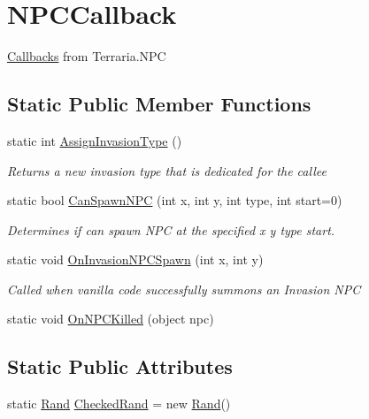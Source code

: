 \hypertarget{classOTA_1_1Callbacks_1_1NPCCallback}{}\section{N\+P\+C\+Callback}
\label{classOTA_1_1Callbacks_1_1NPCCallback}


\hyperlink{namespaceOTA_1_1Callbacks}{Callbacks} from Terraria.\+N\+P\+C  


\subsection*{Static Public Member Functions}
\begin{DoxyCompactItemize}
\item 
static int \hyperlink{classOTA_1_1Callbacks_1_1NPCCallback_a4e28a06fc52f876963bbcbe5fd3c05cb}{Assign\+Invasion\+Type} ()
\begin{DoxyCompactList}\small\item\em Returns a new invasion type that is dedicated for the callee \end{DoxyCompactList}\item 
static bool \hyperlink{classOTA_1_1Callbacks_1_1NPCCallback_a91e5759f1b696acfcd3517e08e2065eb}{Can\+Spawn\+N\+P\+C} (int x, int y, int type, int start=0)
\begin{DoxyCompactList}\small\item\em Determines if can spawn N\+P\+C at the specified x y type start. \end{DoxyCompactList}\item 
static void \hyperlink{classOTA_1_1Callbacks_1_1NPCCallback_a618416750b92cfc4cdf8cda1f605e512}{On\+Invasion\+N\+P\+C\+Spawn} (int x, int y)
\begin{DoxyCompactList}\small\item\em Called when vanilla code successfully summons an Invasion N\+P\+C \end{DoxyCompactList}\item 
static void \hyperlink{classOTA_1_1Callbacks_1_1NPCCallback_af30b6bb1af4e726827f2051fd689513f}{On\+N\+P\+C\+Killed} (object npc)
\end{DoxyCompactItemize}
\subsection*{Static Public Attributes}
\begin{DoxyCompactItemize}
\item 
static \hyperlink{classOTA_1_1Callbacks_1_1Rand}{Rand} \hyperlink{classOTA_1_1Callbacks_1_1NPCCallback_a568e883e75847455390b76742a3c6ad0}{Checked\+Rand} = new \hyperlink{classOTA_1_1Callbacks_1_1Rand}{Rand}()
\end{DoxyCompactItemize}


